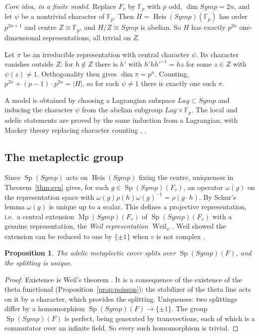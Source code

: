 \documentclass[11pt]{amsart}
\newtheorem{proposition}[theorem]{Proposition}
\theoremstyle{definition}
\theoremstyle{remark}
\newcommand{\Symp}{\mathit{Symp}}
\newcommand{\Lag}{\mathit{Lag}}
\DeclareMathOperator{\Heis}{Heis}
\DeclareMathOperator{\Sp}{Sp}
\DeclareMathOperator{\Mp}{Mp}
\DeclareMathOperator{\Weil}{Weil}
\newcommand{\F}{\mathbb{F}}
\begin{document}
\noindent\emph{Core idea, in a finite model.} Replace $F_v$ by $\F_p$ with $p$ odd, $\dim\Symp=2n$, and let $\psi$ be a nontrivial character of $\F_p$. Then $H=\Heis(\Symp)(\F_p)$ has order $p^{2n+1}$ and centre $Z\cong\F_p$, and $H/Z\cong\Symp$ is abelian. So $H$ has exactly $p^{2n}$ one-dimensional representations, all trivial on $Z$.

Let $\pi$ be an irreducible representation with central character $\psi$. Its character vanishes outside $Z$: for $h\notin Z$ there is $h'$ with $h'hh'^{-1}=hz$ for some $z\in Z$ with $\psi(z)\ne1$. Orthogonality then gives $\dim\pi=p^{n}$. Counting, $p^{2n}+(p-1)\cdot p^{2n}=|H|$, so for each $\psi\ne1$ there is exactly one such $\pi$.

A model is obtained by choosing a Lagrangian subspace $\Lag\subset\Symp$ and inducing the character $\psi$ from the abelian subgroup $\Lag\times\F_p$. The local and adelic statements are proved by the same induction from a Lagrangian, with Mackey theory replacing character counting \cite[Ch.~2]{MVW}, \cite[\S1]{Weil-Acta}.

\subsection{The metaplectic group}
Since $\Sp(\Symp)$ acts on $\Heis(\Symp)$ fixing the centre, uniqueness in Theorem~\ref{thm:svn} gives, for each $g\in\Sp(\Symp)(F_v)$, an operator $\omega(g)$ on the representation space with $\omega(g)\rho(h)\omega(g)^{-1}=\rho(g\cdot h)$. By Schur's lemma $\omega(g)$ is unique up to a scalar. This defines a projective representation, i.e.\ a central extension $\Mp(\Symp)(F_v)$ of $\Sp(\Symp)(F_v)$ with a genuine representation, the \emph{Weil representation} $\Weil_\psi$. Weil showed the extension can be reduced to one by $\{\pm1\}$ when $v$ is not complex \cite{Weil-Acta}.

\begin{proposition}\label{prop:rational-splitting}
The adelic metaplectic cover splits over $\Sp(\Symp)(F)$, and the splitting is unique.
\end{proposition}

\begin{proof}
Existence is Weil's theorem \cite[\S\S 34--43]{Weil-Acta}. It is a consequence of the existence of the theta functional (Proposition~\ref{prop:poisson}): the stabilizer of the theta line acts on it by a character, which provides the splitting. Uniqueness: two splittings differ by a homomorphism $\Sp(\Symp)(F)\to\{\pm1\}$. The group $\Sp(\Symp)(F)$ is perfect, being generated by transvections, each of which is a commutator over an infinite field. So every such homomorphism is trivial.
\end{proof}
\end{document}
